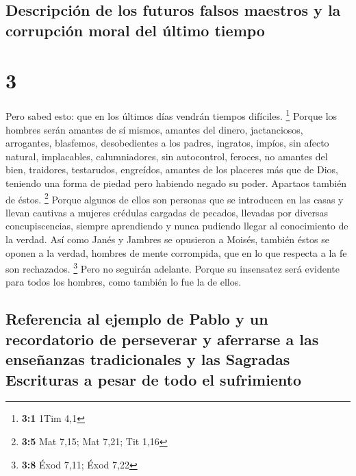 \hypertarget{descripciuxf3n-de-los-futuros-falsos-maestros-y-la-corrupciuxf3n-moral-del-uxfaltimo-tiempo}{%
\subsection{Descripción de los futuros falsos maestros y la corrupción
moral del último
tiempo}\label{descripciuxf3n-de-los-futuros-falsos-maestros-y-la-corrupciuxf3n-moral-del-uxfaltimo-tiempo}}

\hypertarget{section-2}{%
\section{3}\label{section-2}}

 Pero sabed esto: que en los últimos días vendrán tiempos
difíciles. \footnote{\textbf{3:1} 1Tim 4,1}  Porque los
hombres serán amantes de sí mismos, amantes del dinero, jactanciosos,
arrogantes, blasfemos, desobedientes a los padres, ingratos, impíos,
 sin afecto natural, implacables, calumniadores, sin
autocontrol, feroces, no amantes del bien,  traidores,
testarudos, engreídos, amantes de los placeres más que de Dios,
 teniendo una forma de piedad pero habiendo negado su
poder. Apartaos también de éstos. \footnote{\textbf{3:5} Mat 7,15; Mat
  7,21; Tit 1,16}  Porque algunos de ellos son personas
que se introducen en las casas y llevan cautivas a mujeres crédulas
cargadas de pecados, llevadas por diversas concupiscencias,
 siempre aprendiendo y nunca pudiendo llegar al
conocimiento de la verdad.  Así como Janés y Jambres se
opusieron a Moisés, también éstos se oponen a la verdad, hombres de
mente corrompida, que en lo que respecta a la fe son rechazados.
\footnote{\textbf{3:8} Éxod 7,11; Éxod 7,22}  Pero no
seguirán adelante. Porque su insensatez será evidente para todos los
hombres, como también lo fue la de ellos.

\hypertarget{referencia-al-ejemplo-de-pablo-y-un-recordatorio-de-perseverar-y-aferrarse-a-las-enseuxf1anzas-tradicionales-y-las-sagradas-escrituras-a-pesar-de-todo-el-sufrimiento}{%
\subsection{Referencia al ejemplo de Pablo y un recordatorio de
perseverar y aferrarse a las enseñanzas tradicionales y las Sagradas
Escrituras a pesar de todo el
sufrimiento}\label{referencia-al-ejemplo-de-pablo-y-un-recordatorio-de-perseverar-y-aferrarse-a-las-enseuxf1anzas-tradicionales-y-las-sagradas-escrituras-a-pesar-de-todo-el-sufrimiento}}

